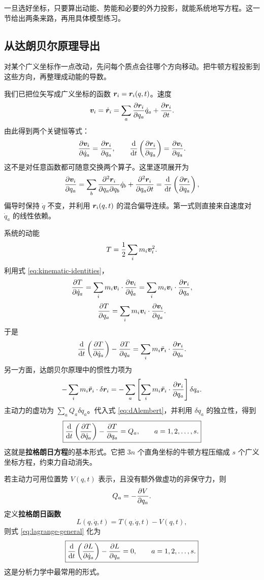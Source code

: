 一旦选好坐标，只要算出动能、势能和必要的外力投影，就能系统地写方程。这一节给出两条来路，再用具体模型练习。

\subsection{从达朗贝尔原理导出}

对某个广义坐标作一点改动，先问每个质点会往哪个方向移动。把牛顿方程投影到这些方向，再整理成动能的导数。

我们已把位矢写成广义坐标的函数 $\boldsymbol{r}_i=\boldsymbol{r}_i(q,t)$。速度
\[
\boldsymbol{v}_i=\dot{\boldsymbol{r}}_i=\sum_a\frac{\partial \boldsymbol{r}_i}{\partial q_a}\dot q_a+\frac{\partial \boldsymbol{r}_i}{\partial t}.
\]
由此得到两个关键恒等式：
\begin{equation}
\frac{\partial \boldsymbol{v}_i}{\partial \dot q_a}=\frac{\partial \boldsymbol{r}_i}{\partial q_a},
\qquad
\frac{\mathrm{d}}{\mathrm{d} t}\left(\frac{\partial \boldsymbol{r}_i}{\partial q_a}\right)=\frac{\partial \boldsymbol{v}_i}{\partial q_a}.
\label{eq:kinematic-identities}
\end{equation}
这不是对任意函数都可随意交换两个算子。这里逐项展开为
\[
\frac{\partial\boldsymbol{v}_i}{\partial q_a}
=\sum_b\frac{\partial^2\boldsymbol{r}_i}{\partial q_a\partial q_b}\dot q_b
+\frac{\partial^2\boldsymbol{r}_i}{\partial q_a\partial t}
=\frac{\mathrm{d}}{\mathrm{d} t}\left(\frac{\partial\boldsymbol{r}_i}{\partial q_a}\right),
\]
偏导时保持 $\dot q$ 不变，并利用 $\boldsymbol{r}_i(q,t)$ 的混合偏导连续。第一式则直接来自速度对 $\dot q_a$ 的线性依赖。

系统的动能
\[
T=\frac12\sum_i m_i\boldsymbol{v}_i^2.
\]
利用式 \eqref{eq:kinematic-identities}，
\[
\frac{\partial T}{\partial \dot q_a}=\sum_i m_i\boldsymbol{v}_i\cdot\frac{\partial \boldsymbol{v}_i}{\partial \dot q_a}
=\sum_i m_i\boldsymbol{v}_i\cdot\frac{\partial \boldsymbol{r}_i}{\partial q_a},
\]
\[
\frac{\partial T}{\partial q_a}=\sum_i m_i\boldsymbol{v}_i\cdot\frac{\partial \boldsymbol{v}_i}{\partial q_a}.
\]
于是
\[
\frac{\mathrm{d}}{\mathrm{d} t}\left(\frac{\partial T}{\partial \dot q_a}\right)-\frac{\partial T}{\partial q_a}
=\sum_i m_i\ddot{\boldsymbol{r}}_i\cdot\frac{\partial \boldsymbol{r}_i}{\partial q_a}.
\]
另一方面，达朗贝尔原理中的惯性力项为
\[
-\sum_i m_i\ddot{\boldsymbol{r}}_i\cdot\delta\boldsymbol{r}_i
=-\sum_a\left[\sum_i m_i\ddot{\boldsymbol{r}}_i\cdot\frac{\partial \boldsymbol{r}_i}{\partial q_a}\right]\delta q_a.
\]
主动力的虚功为 $\sum_a Q_a\delta q_a$。代入式 \eqref{eq:dAlembert}，并利用 $\delta q_a$ 的独立性，得到
\begin{equation}
\boxed{
\frac{\mathrm{d}}{\mathrm{d} t}\left(\frac{\partial T}{\partial \dot q_a}\right)-\frac{\partial T}{\partial q_a}=Q_a,
\qquad a=1,2,\dots,s.
}
\label{eq:lagrange-general}
\end{equation}
这就是\textbf{拉格朗日方程}的基本形式。它把 $3n$ 个直角坐标的牛顿方程压缩成 $s$ 个广义坐标方程，约束力自动消失。

若主动力可用位置势 $V(q,t)$ 表示，且没有额外做虚功的非保守力，则
\[
Q_a=-\frac{\partial V}{\partial q_a}.
\]
定义\textbf{拉格朗日函数}
\begin{equation}
L(q,\dot q,t)=T(q,\dot q,t)-V(q,t),
\label{eq:lagrangian}
\end{equation}
则式 \eqref{eq:lagrange-general} 化为
\begin{equation}
\boxed{
\frac{\mathrm{d}}{\mathrm{d} t}\left(\frac{\partial L}{\partial \dot q_a}\right)-\frac{\partial L}{\partial q_a}=0,
\qquad a=1,2,\dots,s.
}
\label{eq:lagrange-euler}
\end{equation}
这是分析力学中最常用的形式。

